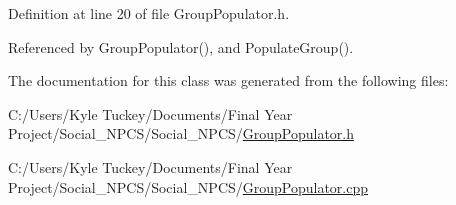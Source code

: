 Definition at line 20 of file Group\+Populator.\+h.



Referenced by Group\+Populator(), and Populate\+Group().



The documentation for this class was generated from the following files\+:\begin{DoxyCompactItemize}
\item 
C\+:/\+Users/\+Kyle Tuckey/\+Documents/\+Final Year Project/\+Social\+\_\+\+N\+P\+C\+S/\+Social\+\_\+\+N\+P\+C\+S/\hyperlink{_group_populator_8h}{Group\+Populator.\+h}\item 
C\+:/\+Users/\+Kyle Tuckey/\+Documents/\+Final Year Project/\+Social\+\_\+\+N\+P\+C\+S/\+Social\+\_\+\+N\+P\+C\+S/\hyperlink{_group_populator_8cpp}{Group\+Populator.\+cpp}\end{DoxyCompactItemize}
